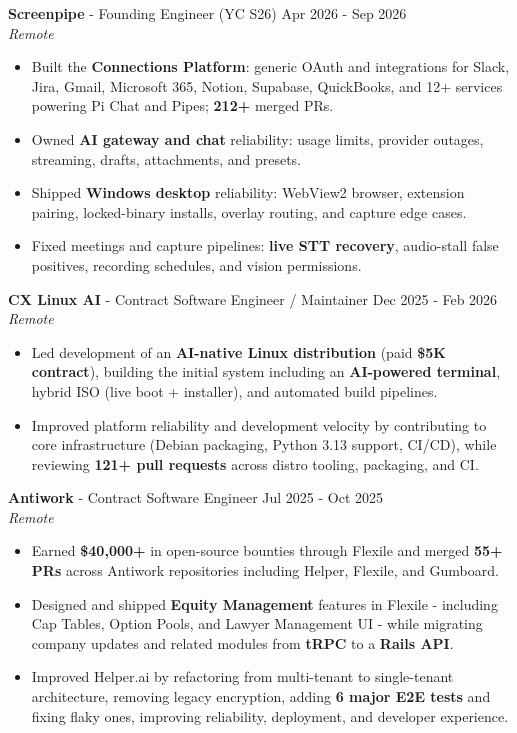 \documentclass[letterpaper,10pt]{article}
\begin{document}
\vspace{2pt}

{\bfseries Screenpipe} - Founding Engineer (YC S26) \hfill Apr 2026 - Sep 2026 \\
\textit{Remote}
\begin{itemize}
    \item Built the \textbf{Connections Platform}: generic OAuth and integrations for Slack, Jira, Gmail, Microsoft 365, Notion, Supabase, QuickBooks, and 12+ services powering Pi Chat and Pipes; \textbf{212+} merged PRs.
    \item Owned \textbf{AI gateway and chat} reliability: usage limits, provider outages, streaming, drafts, attachments, and presets.
    \item Shipped \textbf{Windows desktop} reliability: WebView2 browser, extension pairing, locked-binary installs, overlay routing, and capture edge cases.
    \item Fixed meetings and capture pipelines: \textbf{live STT recovery}, audio-stall false positives, recording schedules, and vision permissions.
\end{itemize}

\vspace{2pt}

{\bfseries CX Linux AI} - Contract Software Engineer / Maintainer \hfill Dec 2025 - Feb 2026 \\
\textit{Remote}
\begin{itemize}
    \item Led development of an \textbf{AI-native Linux distribution} (paid \textbf{\$5K contract}), building the initial system including an \textbf{AI-powered terminal}, hybrid ISO (live boot + installer), and automated build pipelines.
    \item Improved platform reliability and development velocity by contributing to core infrastructure (Debian packaging, Python 3.13 support, CI/CD), while reviewing \textbf{121+ pull requests} across distro tooling, packaging, and CI.
\end{itemize}

\vspace{2pt}

{\bfseries Antiwork} - Contract Software Engineer \hfill Jul 2025 - Oct 2025 \\
\textit{Remote}
\begin{itemize}
    \item Earned \textbf{\$40,000+} in open-source bounties through Flexile and merged \textbf{55+ PRs} across Antiwork repositories including Helper, Flexile, and Gumboard.
    \item Designed and shipped \textbf{Equity Management} features in Flexile - including Cap Tables, Option Pools, and Lawyer Management UI - while migrating company updates and related modules from \textbf{tRPC} to a \textbf{Rails API}.
    \item Improved Helper.ai by refactoring from multi-tenant to single-tenant architecture, removing legacy encryption, adding \textbf{6 major E2E tests} and fixing flaky ones, improving reliability, deployment, and developer experience.
\end{itemize}
\end{document}
